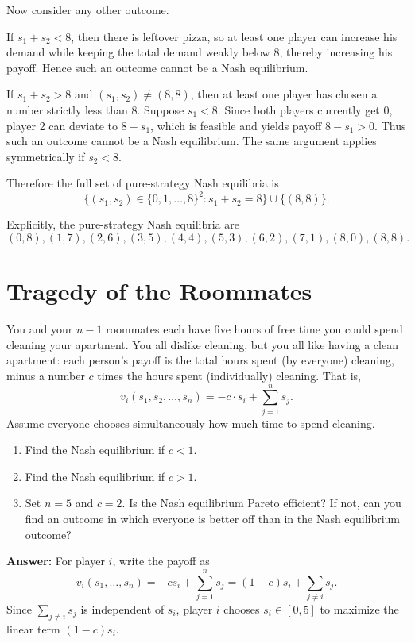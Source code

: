\documentclass[12pt,a4paper]{article}
\begin{document}
\begin{enumerate}[label=(\alph*)]
  Now consider any other outcome. 
  
  If \(s_1+s_2<8\), then there is leftover pizza, so at least one player can increase his demand while keeping the total demand weakly below \(8\), thereby increasing his payoff. Hence such an outcome cannot be a Nash equilibrium.

  If \(s_1+s_2>8\) and \((s_1,s_2)\neq(8,8)\), then at least one player has chosen a number strictly less than \(8\). Suppose \(s_1<8\). Since both players currently get \(0\), player 2 can deviate to \(8-s_1\), which is feasible and yields payoff \(8-s_1>0\). Thus such an outcome cannot be a Nash equilibrium. The same argument applies symmetrically if \(s_2<8\).

  Therefore the full set of pure-strategy Nash equilibria is
  \[
  \{(s_1,s_2)\in\{0,1,\dots,8\}^2: s_1+s_2=8\}\cup\{(8,8)\}.
  \]

  Explicitly, the pure-strategy Nash equilibria are
  \[
  (0,8),(1,7),(2,6),(3,5),(4,4),(5,3),(6,2),(7,1),(8,0),(8,8).
  \]
\end{enumerate}

\section{Tragedy of the Roommates}
You and your $n-1$ roommates each have five hours of free time you could spend cleaning your apartment. You all dislike cleaning, but you all like having a clean apartment: each person's payoff is the total hours spent (by everyone) cleaning, minus a number $c$ times the hours spent (individually) cleaning. That is,
\[
    v_i(s_1,s_2,\ldots,s_n)=-c\cdot s_i+\sum_{j=1}^n s_j.
\]
Assume everyone chooses simultaneously how much time to spend cleaning.
\begin{enumerate}[label=(\alph*)]
  \item Find the Nash equilibrium if $c<1$.
  \item Find the Nash equilibrium if $c>1$.
  \item Set $n=5$ and $c=2$. Is the Nash equilibrium Pareto efficient? If not, can you find an outcome in which everyone is better off than in the Nash equilibrium outcome?
\end{enumerate}

\vspace{0.5cm}

\noindent\textbf{Answer:} For player $i$, write the payoff as
\[
    v_i(s_1,\dots,s_n)=-c s_i+\sum_{j=1}^n s_j
    =(1-c)s_i+\sum_{j\ne i}s_j.
\]
Since $\sum_{j\ne i}s_j$ is independent of $s_i$, player $i$ chooses $s_i\in[0,5]$ to maximize the linear term $(1-c)s_i$.
\end{document}
